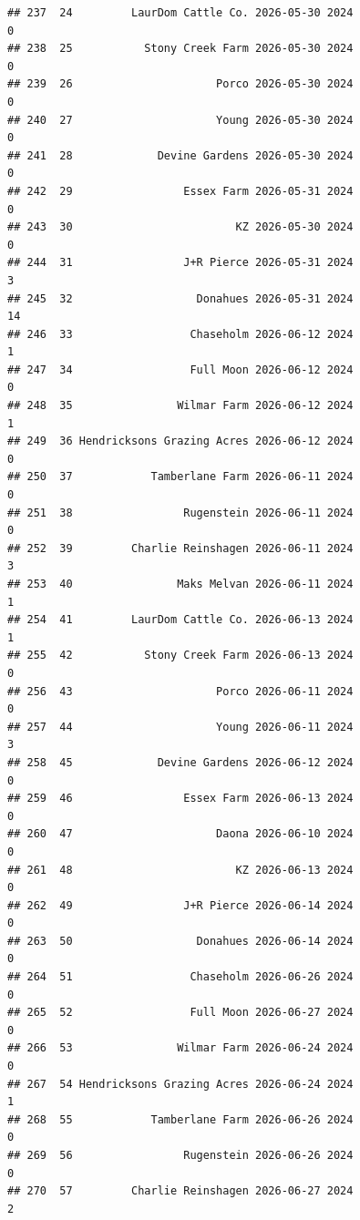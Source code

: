 \documentclass[
]{article}
\begin{document}
\begin{verbatim}
## 237  24         LaurDom Cattle Co. 2026-05-30 2024                       0
## 238  25           Stony Creek Farm 2026-05-30 2024                       0
## 239  26                      Porco 2026-05-30 2024                       0
## 240  27                      Young 2026-05-30 2024                       0
## 241  28             Devine Gardens 2026-05-30 2024                       0
## 242  29                 Essex Farm 2026-05-31 2024                       0
## 243  30                         KZ 2026-05-30 2024                       0
## 244  31                 J+R Pierce 2026-05-31 2024                       3
## 245  32                   Donahues 2026-05-31 2024                      14
## 246  33                  Chaseholm 2026-06-12 2024                       1
## 247  34                  Full Moon 2026-06-12 2024                       0
## 248  35                Wilmar Farm 2026-06-12 2024                       1
## 249  36 Hendricksons Grazing Acres 2026-06-12 2024                       0
## 250  37            Tamberlane Farm 2026-06-11 2024                       0
## 251  38                 Rugenstein 2026-06-11 2024                       0
## 252  39         Charlie Reinshagen 2026-06-11 2024                       3
## 253  40                Maks Melvan 2026-06-11 2024                       1
## 254  41         LaurDom Cattle Co. 2026-06-13 2024                       1
## 255  42           Stony Creek Farm 2026-06-13 2024                       0
## 256  43                      Porco 2026-06-11 2024                       0
## 257  44                      Young 2026-06-11 2024                       3
## 258  45             Devine Gardens 2026-06-12 2024                       0
## 259  46                 Essex Farm 2026-06-13 2024                       0
## 260  47                      Daona 2026-06-10 2024                       0
## 261  48                         KZ 2026-06-13 2024                       0
## 262  49                 J+R Pierce 2026-06-14 2024                       0
## 263  50                   Donahues 2026-06-14 2024                       0
## 264  51                  Chaseholm 2026-06-26 2024                       0
## 265  52                  Full Moon 2026-06-27 2024                       0
## 266  53                Wilmar Farm 2026-06-24 2024                       0
## 267  54 Hendricksons Grazing Acres 2026-06-24 2024                       1
## 268  55            Tamberlane Farm 2026-06-26 2024                       0
## 269  56                 Rugenstein 2026-06-26 2024                       0
## 270  57         Charlie Reinshagen 2026-06-27 2024                       2

\end{verbatim}
\end{document}
